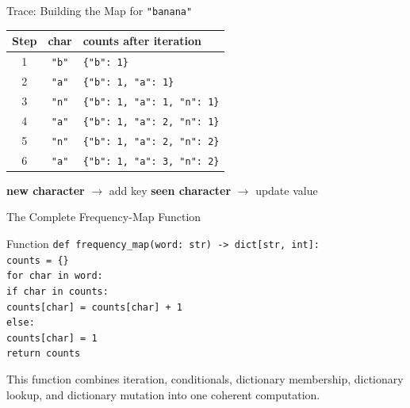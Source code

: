 \documentclass[aspectratio=169,10pt]{beamer}
\begin{document}
\begin{frame}{Trace: Building the Map for \texttt{"banana"}}
  \begin{center}
    \renewcommand{\arraystretch}{1.22}
    \begin{tabular}{c|c|l}
      \textbf{Step} & \textbf{char} & \textbf{counts after iteration} \\\hline
      1 & \texttt{"b"} & \texttt{\{"b": 1\}} \\
      2 & \texttt{"a"} & \texttt{\{"b": 1, "a": 1\}} \\
      3 & \texttt{"n"} & \texttt{\{"b": 1, "a": 1, "n": 1\}} \\
      4 & \texttt{"a"} & \texttt{\{"b": 1, "a": 2, "n": 1\}} \\
      5 & \texttt{"n"} & \texttt{\{"b": 1, "a": 2, "n": 2\}} \\
      6 & \texttt{"a"} & \texttt{\{"b": 1, "a": 3, "n": 2\}}
    \end{tabular}
  \end{center}

  \begin{center}
    \textbf{new character} $\rightarrow$ add key \qquad
    \textbf{seen character} $\rightarrow$ update value
  \end{center}
\end{frame}

\begin{frame}{The Complete Frequency-Map Function}
  \begin{block}{Function}
    \texttt{def frequency\_map(word: str) -> dict[str, int]:}\\
    \hspace{0.20in}\texttt{counts = \{\}}\\
    \hspace{0.20in}\texttt{for char in word:}\\
    \hspace{0.40in}\texttt{if char in counts:}\\
    \hspace{0.60in}\texttt{counts[char] = counts[char] + 1}\\
    \hspace{0.40in}\texttt{else:}\\
    \hspace{0.60in}\texttt{counts[char] = 1}\\
    \hspace{0.20in}\texttt{return counts}
  \end{block}

  \begin{keyidea}
    This function combines iteration, conditionals, dictionary membership, dictionary lookup, and dictionary mutation into one coherent computation.
  \end{keyidea}
\end{frame}
\end{document}
